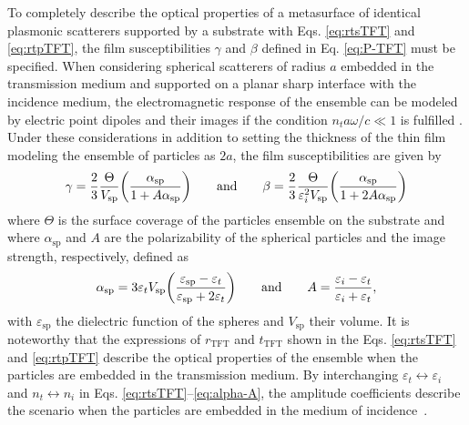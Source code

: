 To completely describe the optical properties of a metasurface of identical plasmonic scatterers supported by a substrate with Eqs. \eqref{eq:rtsTFT} and \eqref{eq:rtpTFT}, the film susceptibilities $\gamma$ and $\beta$ defined in Eq. \eqref{eq:P-TFT} must be specified. When considering spherical scatterers of radius $a$ embedded in the transmission medium and supported on a planar sharp interface with the incidence medium, the electromagnetic response of the ensemble can be modeled by electric point dipoles and their images if the condition $n_ta\omega/c \ll 1$ is fulfilled \cite{lazzari_granfilm_2002}. Under these considerations in addition to setting the thickness of the thin film modeling the ensemble of particles as $2a$, the film susceptibilities are given by \cite{lazzari_granfilm_2002,bedeaux_optical_2004,haarmans_optical_1995}
%
\begin{align}
	\gamma = \frac23 \frac{\Theta}{V_\text{sp}} \qty( \frac{\alpha_\text{sp}}{1 + A \alpha_\text{sp}})
	\qquad\text{and}\qquad
	 \beta =\frac23 \frac{\Theta}{\varepsilon_i^2 V_\text{sp}} \qty(\frac{\alpha_\text{sp}}{1 + 2 A \alpha_\text{sp}})
\label{eq:gammabeta}
\end{align}
%
where $\Theta$ is the surface coverage of the particles ensemble on the substrate and where $\alpha_\text{sp}$ and $A$ are the polarizability of the spherical particles and the image strength, respectively, defined as
%
\begin{align}
	\alpha_\text{sp} = 3  \varepsilon_t V_\text{sp} \qty(\frac{\varepsilon_\text{sp} - \varepsilon_t}{\varepsilon_\text{sp} + 2 \varepsilon_t}) 
	\qquad\text{and}\qquad
	A = \frac{\varepsilon_i - \varepsilon_t}{\varepsilon_i + \varepsilon_t},
	\label{eq:alpha-A}
\end{align}
%
with  $\varepsilon_\text{sp}$ the dielectric function of the spheres and $V_\text{sp}$ their volume. It is noteworthy that  the expressions of $r_\text{TFT}$ and $t_\text{TFT}$ shown in the Eqs. \eqref{eq:rtsTFT} and \eqref{eq:rtpTFT} describe the optical properties of the ensemble when the particles are embedded in the transmission medium. By interchanging $\varepsilon_t \leftrightarrow \varepsilon_i$ and $n_ t \leftrightarrow n_i$ in Eqs. \eqref{eq:rtsTFT}--\eqref{eq:alpha-A}, the amplitude coefficients describe the scenario when the particles are embedded in the medium of incidence~\cite{bedeaux_optical_2004}.
































